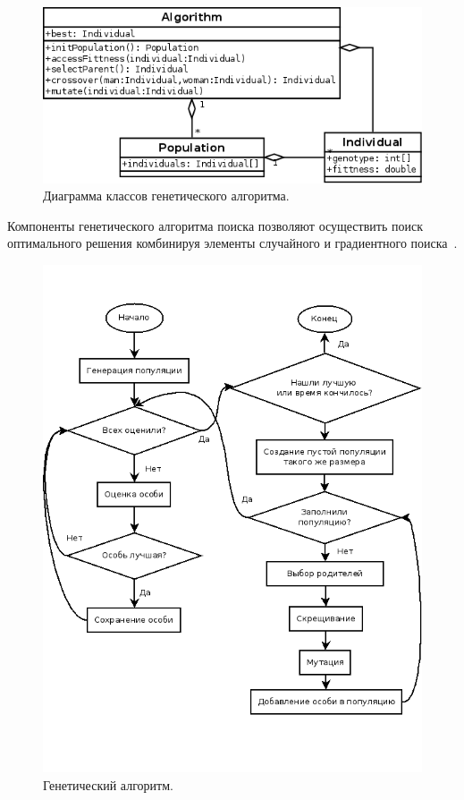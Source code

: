 \documentclass[russian,utf8,emptystyle,12pt]{eskdtext}
\begin{document}
        \begin{figure}[h!]
            \centering
            \includegraphics[scale=0.48]{ga-classes.png}
            \caption{Диаграмма классов генетического алгоритма.}
            \label{fig:ga-classes}
        \end{figure}
        
	    Компоненты генетического алгоритма поиска позволяют осуществить поиск оптимального решения комбинируя элементы случайного и градиентного поиска~\cite{bib:metaheuristics}. 
                        	    
        \begin{figure}[h!]
            \centering
            \includegraphics[scale=0.6]{ga.png}
            \caption{Генетический алгоритм.}
            \label{fig:ga}
        \end{figure}	
		
\end{document}
